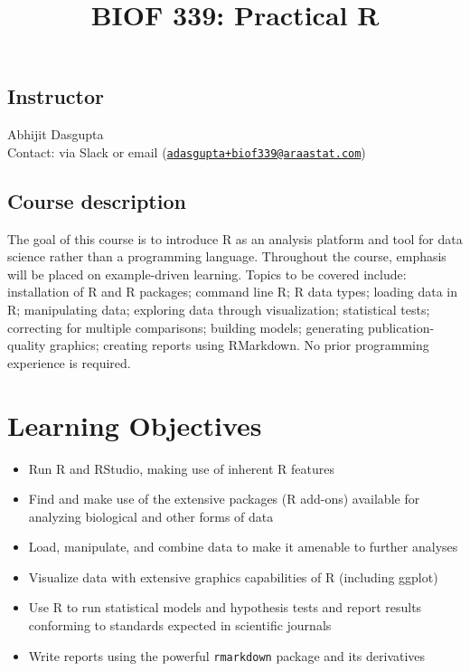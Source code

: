 \documentclass[
]{article}
\title{BIOF 339: Practical R}
\author{}
\date{\vspace{-2.5em}}
\providecommand{\tightlist}{%
  \setlength{\itemsep}{0pt}\setlength{\parskip}{0pt}}
\begin{document}
\maketitle

\hypertarget{instructor}{%
\subsection{Instructor}\label{instructor}}

Abhijit Dasgupta\\
Contact: via Slack or email
(\href{mailto:adasgupta+biof339@araastat.com}{\nolinkurl{adasgupta+biof339@araastat.com}})

\hypertarget{course-description}{%
\subsection{Course description}\label{course-description}}

The goal of this course is to introduce R as an analysis platform and
tool for data science rather than a programming language. Throughout the
course, emphasis will be placed on example-driven learning. Topics to be
covered include: installation of R and R packages; command line R; R
data types; loading data in R; manipulating data; exploring data through
visualization; statistical tests; correcting for multiple comparisons;
building models; generating publication-quality graphics; creating
reports using RMarkdown. No prior programming experience is required.

\hypertarget{learning-objectives}{%
\section{Learning Objectives}\label{learning-objectives}}

\begin{itemize}
\tightlist
\item
  Run R and RStudio, making use of inherent R features
\item
  Find and make use of the extensive packages (R add-ons) available for
  analyzing biological and other forms of data
\item
  Load, manipulate, and combine data to make it amenable to further
  analyses
\item
  Visualize data with extensive graphics capabilities of R (including
  ggplot)
\item
  Use R to run statistical models and hypothesis tests and report
  results conforming to standards expected in scientific journals
\item
  Write reports using the powerful \texttt{rmarkdown} package and its
  derivatives
\end{itemize}
\end{document}
